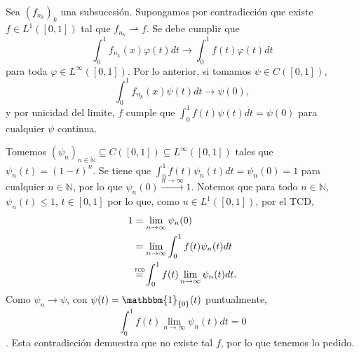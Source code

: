 \documentclass[11pt]{article}
\newenvironment{Solucion}[1][]
{%
  \newline
	\noindent{\ttfamily SOLUCIÓN}~
}%
{%
}
\newcommand\myeq[1]{\mathrel{\overset{\makebox[0pt]{\mbox{\normalfont\tiny\sffamily #1}}}{=}}}
\newcommand{\set}[1]{\left\lbrace #1\right\rbrace}
\newcommand{\N}{\mathbb{N}}
\begin{document}
\begin{Solucion}
\begin{enumerate}[(a)]
  Sea \((f_{n_k})_k\) una subsucesión. Supongamos por contradicción que existe \(f\in L^1([0,1])\) tal que \(f_{n_k}\rightharpoonup f\). Se debe cumplir que
  \begin{equation*}
      \int_{0}^1f_{n_k}(x)\varphi(t)dt \to \int_{0}^1 f(t)\varphi(t)dt
  \end{equation*}
  para toda \(\varphi\in L^\infty([0,1])\). Por lo anterior, si tomamos \(\psi\in C([0,1])\),
  \begin{equation*}
      \int_{0}^1f_{n_k}(x)\psi(t)dt \to \psi(0),
  \end{equation*}
  y por unicidad del limite, \(f\) cumple que \(\int_{0}^1 f(t)\psi(t)dt=\psi(0)\) para cualquier \(\psi\) continua.

  Tomemos \((\psi_n)_{n\in\N}\subseteq C([0,1])\subseteq L^{\infty}([0,1])\) tales que \(\psi_n(t)=(1-t)^n\). Se tiene que \(\int_{0}^1f(t)\psi_n(t)dt=\psi_n(0)=1\) para cualquier \(n\in \N\), por lo que  \(\psi_n(0)\xrightarrow{n\to\infty} 1\). Notemos que para todo \(n\in\N\), \(\psi_n(t)\leq 1\), \(t\in [0,1]\) por lo que, como \(u\in L^1([0,1])\), por el TCD,
  \begin{align*}
      1&=\lim_{n\to\infty}\psi_n(0)\\
      &=\lim_{n\to\infty}\int_{0}^1f(t)\psi_n(t)dt\\
      &\myeq{TCD}\int_{0}^1f(t)\lim_{n\to\infty}\psi_n(t)dt.
  \end{align*}
  Como \(\psi_n\to \psi\), con \(\psi(t)=\mathbbm{1}_{\set{0}}(t)\) puntualmente,
  \[\int_{0}^1f(t)\lim_{n\to\infty}\psi_n(t)dt=0\].
  Esta contradicción demuestra que no existe tal \(f\), por lo que tenemos lo pedido.
\end{enumerate}
\end{Solucion}
\end{document}
